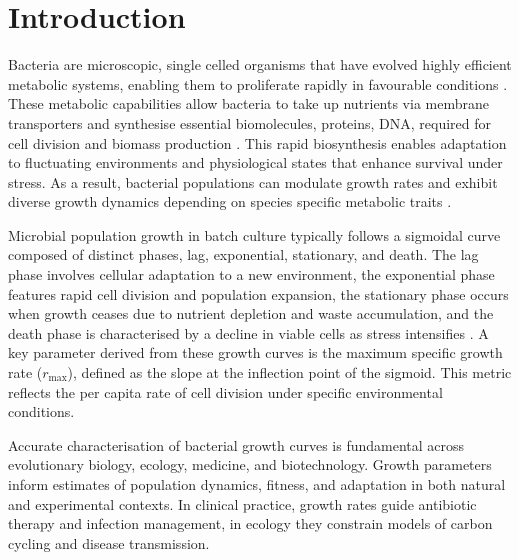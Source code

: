 \documentclass[11pt,a4paper]{article}
\begin{document}
\newpage

\section{Introduction}

Bacteria are microscopic, single celled organisms that have evolved
highly efficient metabolic systems, enabling them to proliferate rapidly
in favourable conditions \citep{Basan2019}. These metabolic capabilities
allow bacteria to take up nutrients via membrane transporters and
synthesise essential biomolecules, proteins, DNA, required for cell
division and biomass production \citep{Micali2022}. This rapid
biosynthesis enables adaptation to fluctuating environments and
physiological states that enhance survival under stress. As a result,
bacterial populations can modulate growth rates and exhibit diverse
growth dynamics depending on species specific metabolic traits
\citep{Bakshi2021}.

Microbial population growth in batch culture typically follows a
sigmoidal curve composed of distinct phases, lag, exponential,
stationary, and death. The lag phase involves cellular adaptation to a
new environment, the exponential phase features rapid cell division and
population expansion, the stationary phase occurs when growth ceases due
to nutrient depletion and waste accumulation, and the death phase is
characterised by a decline in viable cells as stress intensifies
\citep{Peleg2023}. A key parameter derived from these growth curves is
the maximum specific growth rate ($r_{\max}$), defined as the slope at the
inflection point of the sigmoid. This metric reflects the per capita rate
of cell division under specific environmental conditions.

Accurate characterisation of bacterial growth curves is fundamental
across evolutionary biology, ecology, medicine, and biotechnology.
Growth parameters inform estimates of population dynamics, fitness, and
adaptation in both natural and experimental contexts. In clinical
practice, growth rates guide antibiotic therapy and infection management,
in ecology they constrain models of carbon cycling and disease
transmission.
\end{document}
